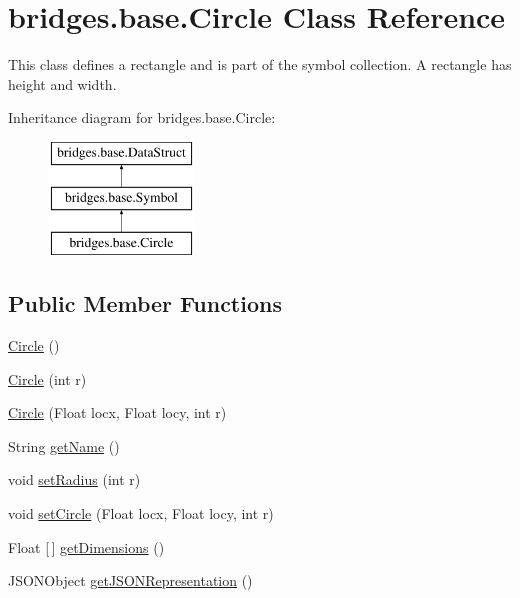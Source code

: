 \hypertarget{classbridges_1_1base_1_1_circle}{}\section{bridges.\+base.\+Circle Class Reference}
\label{classbridges_1_1base_1_1_circle}


This class defines a rectangle and is part of the symbol collection. A rectangle has height and width.  


Inheritance diagram for bridges.\+base.\+Circle\+:\begin{figure}[H]
\begin{center}
\leavevmode
\includegraphics[height=3.000000cm]{classbridges_1_1base_1_1_circle}
\end{center}
\end{figure}
\subsection*{Public Member Functions}
\begin{DoxyCompactItemize}
\item 
\mbox{\hyperlink{classbridges_1_1base_1_1_circle_a807231dff01120041d7d209d049e3029}{Circle}} ()
\item 
\mbox{\hyperlink{classbridges_1_1base_1_1_circle_abfd82d0ca10193a51234657253051beb}{Circle}} (int r)
\item 
\mbox{\hyperlink{classbridges_1_1base_1_1_circle_a5c7d699257b3e67ac7a3c52e9f05b376}{Circle}} (Float locx, Float locy, int r)
\item 
String \mbox{\hyperlink{classbridges_1_1base_1_1_circle_a3782ea68f0419747c00bd8b2bfa31462}{get\+Name}} ()
\item 
void \mbox{\hyperlink{classbridges_1_1base_1_1_circle_a2587268c948c5e65dd35d4803d133fb1}{set\+Radius}} (int r)
\item 
void \mbox{\hyperlink{classbridges_1_1base_1_1_circle_ab8c228507cbf3067c40d74e35563d1cf}{set\+Circle}} (Float locx, Float locy, int r)
\item 
Float \mbox{[}$\,$\mbox{]} \mbox{\hyperlink{classbridges_1_1base_1_1_circle_af16fe10d1dc5bbac325284f91e66b42a}{get\+Dimensions}} ()
\item 
J\+S\+O\+N\+Object \mbox{\hyperlink{classbridges_1_1base_1_1_circle_ad6a8b8e2dca562fd3fa5254ee861ed70}{get\+J\+S\+O\+N\+Representation}} ()
\end{DoxyCompactItemize}

